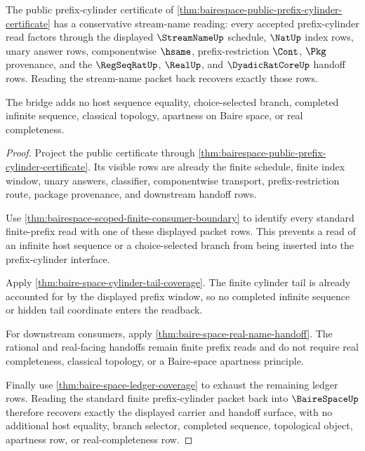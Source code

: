 \begin{theorem}\label{thm:bairespace-prefix-stream-bridge}
The public prefix-cylinder certificate of
\autoref{thm:bairespace-public-prefix-cylinder-certificate} has a conservative
stream-name reading: every accepted prefix-cylinder read factors through the
displayed $\StreamNameUp$ schedule, $\NatUp$ index rows, unary answer rows,
componentwise $\hsame$, prefix-restriction $\Cont$, $\Pkg$ provenance, and the
$\RegSeqRatUp$, $\RealUp$, and $\DyadicRatCoreUp$ handoff rows. Reading the
stream-name packet back recovers exactly those rows.

The bridge adds no host sequence equality, choice-selected branch, completed
infinite sequence, classical topology, apartness on Baire space, or real
completeness.
\end{theorem}
\begin{proof}
Project the public certificate through
\autoref{thm:bairespace-public-prefix-cylinder-certificate}. Its visible rows
are already the finite schedule, finite index window, unary answers,
classifier, componentwise transport, prefix-restriction route, package
provenance, and downstream handoff rows.

Use \autoref{thm:bairespace-scoped-finite-consumer-boundary} to identify every
standard finite-prefix read with one of these displayed packet rows. This
prevents a read of an infinite host sequence or a choice-selected branch from
being inserted into the prefix-cylinder interface.

Apply \autoref{thm:baire-space-cylinder-tail-coverage}. The finite cylinder
tail is already accounted for by the displayed prefix window, so no completed
infinite sequence or hidden tail coordinate enters the readback.

For downstream consumers, apply
\autoref{thm:baire-space-real-name-handoff}. The rational and real-facing
handoffs remain finite prefix reads and do not require real completeness,
classical topology, or a Baire-space apartness principle.

Finally use \autoref{thm:baire-space-ledger-coverage} to exhaust the remaining
ledger rows. Reading the standard finite prefix-cylinder packet back into
$\BaireSpaceUp$ therefore recovers exactly the displayed carrier and handoff
surface, with no additional host equality, branch selector, completed
sequence, topological object, apartness row, or real-completeness row.
\end{proof}


